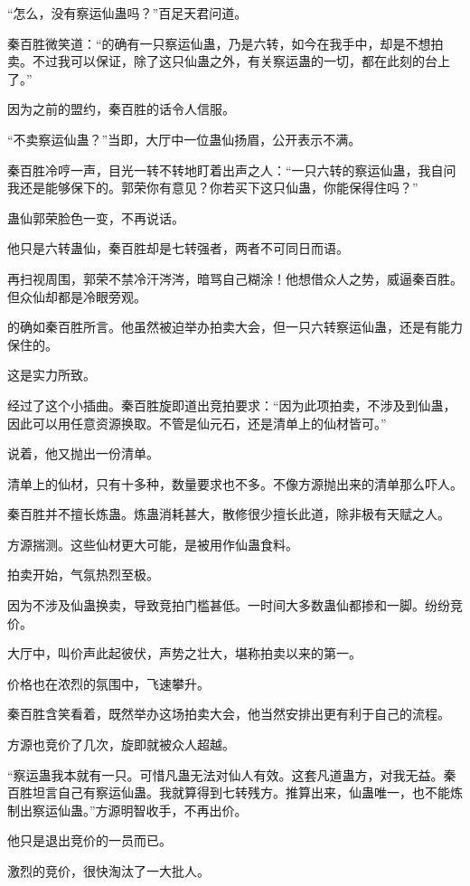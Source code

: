 \begin{this_body}
“怎么，没有察运仙蛊吗？”百足天君问道。

秦百胜微笑道：“的确有一只察运仙蛊，乃是六转，如今在我手中，却是不想拍卖。不过我可以保证，除了这只仙蛊之外，有关察运蛊的一切，都在此刻的台上了。”

因为之前的盟约，秦百胜的话令人信服。

“不卖察运仙蛊？”当即，大厅中一位蛊仙扬眉，公开表示不满。

秦百胜冷哼一声，目光一转不转地盯着出声之人：“一只六转的察运仙蛊，我自问我还是能够保下的。郭荣你有意见？你若买下这只仙蛊，你能保得住吗？”

蛊仙郭荣脸色一变，不再说话。

他只是六转蛊仙，秦百胜却是七转强者，两者不可同日而语。

再扫视周围，郭荣不禁冷汗涔涔，暗骂自己糊涂！他想借众人之势，威逼秦百胜。但众仙却都是冷眼旁观。

的确如秦百胜所言。他虽然被迫举办拍卖大会，但一只六转察运仙蛊，还是有能力保住的。

这是实力所致。

经过了这个小插曲。秦百胜旋即道出竞拍要求：“因为此项拍卖，不涉及到仙蛊，因此可以用任意资源换取。不管是仙元石，还是清单上的仙材皆可。”

说着，他又抛出一份清单。

清单上的仙材，只有十多种，数量要求也不多。不像方源抛出来的清单那么吓人。

秦百胜并不擅长炼蛊。炼蛊消耗甚大，散修很少擅长此道，除非极有天赋之人。

方源揣测。这些仙材更大可能，是被用作仙蛊食料。

拍卖开始，气氛热烈至极。

因为不涉及仙蛊换卖，导致竞拍门槛甚低。一时间大多数蛊仙都掺和一脚。纷纷竞价。

大厅中，叫价声此起彼伏，声势之壮大，堪称拍卖以来的第一。

价格也在浓烈的氛围中，飞速攀升。

秦百胜含笑看着，既然举办这场拍卖大会，他当然安排出更有利于自己的流程。

方源也竞价了几次，旋即就被众人超越。

“察运蛊我本就有一只。可惜凡蛊无法对仙人有效。这套凡道蛊方，对我无益。秦百胜坦言自己有察运仙蛊。我就算得到七转残方。推算出来，仙蛊唯一，也不能炼制出察运仙蛊。”方源明智收手，不再出价。

他只是退出竞价的一员而已。

激烈的竞价，很快淘汰了一大批人。


\end{this_body}
